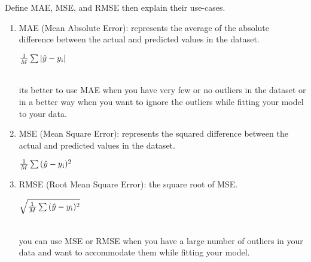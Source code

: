 \documentclass[11pt,letterpaper]{article}
\begin{document}
\begin{exercise}
    Define MAE, MSE, and RMSE then explain their use-cases.
    \begin{enumerate}
        \item MAE (Mean Absolute Error): represents the average of the absolute difference between the actual and predicted values in the dataset. 
        \\ \centerline{$\frac{1}{M}\sum{|\hat{y} - y\textsubscript{i}|}$}
        \\ its better to use MAE when you have very few or no outliers in the dataset or in a better way when you want to ignore the outliers while fitting your model to your data.
        \item MSE (Mean Square Error): represents the squared difference between the actual and predicted values in the dataset.
        \\ \centerline{$\frac{1}{M}\sum{(\hat{y} - y\textsubscript{i})\textsuperscript{2}}$}
        \item RMSE (Root Mean Square Error): the square root of MSE.
        \\ \centerline{$\sqrt{\frac{1}{M}\sum{(\hat{y} - y\textsubscript{i})\textsuperscript{2}}}$}
        \\ you can use MSE or RMSE when you have a large number of outliers in your data and want to accommodate them while fitting your model.
    \end{enumerate}
\end{exercise}
\end{document}
